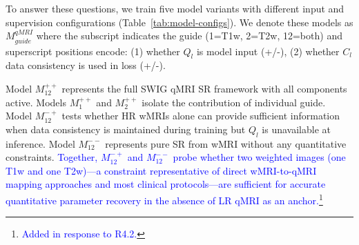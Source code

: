 \documentclass[journal,twoside,web]{ieeecolor}
\newcommand{\added}[1]{\textcolor{blue}{#1}}      %
\begin{document}
To answer these questions, we train five model variants with different input and supervision configurations (Table~\ref{tab:model-configs}). We denote these models as $M_{guide}^{qMRI}$ where the subscript indicates the guide (1=T1w, 2=T2w, 12=both) and superscript positions encode: (1) whether $Q_l$ is model input (+/-), (2) whether $C_l$ data consistency is used in loss (+/-).


Model $M_{12}^{++}$ represents the full SWIG qMRI SR framework with all components active. Models $M_{1}^{++}$ and $M_{2}^{++}$ isolate the contribution of individual guide. Model $M_{12}^{-+}$ tests whether HR wMRIs alone can provide sufficient information when data consistency is maintained during training but $Q_l$ is unavailable at inference. Model $M_{12}^{--}$ represents pure SR from wMRI without any quantitative constraints.  \added{Together, $M_{12}^{-+}$ and $M_{12}^{--}$ probe whether two weighted images (one T1w and one T2w)---a constraint representative of direct wMRI-to-qMRI mapping approaches and most clinical protocols---are sufficient for accurate quantitative parameter recovery in the absence of LR qMRI as an anchor.\footnote{\textcolor{blue}{Added in response to R4.2.}}}
\end{document}
